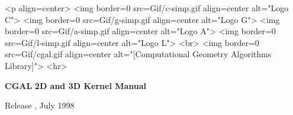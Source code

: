 
\pagestyle{empty}

\begin{titlepage}
\mbox{}
\vskip3cm

\ccTexHtml
{\centerline{
    }}
 {<p align=center>
   <img border=0 src=Gif/c-simp.gif align=center alt="Logo C">
   <img border=0 src=Gif/g-simp.gif align=center alt="Logo G">
   <img border=0 src=Gif/a-simp.gif align=center alt="Logo A">
   <img border=0 src=Gif/l-simp.gif align=center alt="Logo L">
   <br>
   <img border=0 src=Gif/cgal.gif align=center
    alt="[Computational Geometry Algorithms Library]">
    <hr>}

\vskip2cm
\centerline{ {\Huge\bf CGAL} {\huge\bf 2D and 3D Kernel Manual } }

\vskip2cm
\newcommand{\mydate}{July 1998}
\ccTexHtml
{\renewcommand{\mydate}{\ifcase\the\month \or January\or
    February\or March\or April\or May\or June\or July\or August\or
    September\or October\or November\or December\fi~\the\year}}{}
  \centerline{ {\large Release \cgalrelease, \mydate} }

\end{titlepage}




